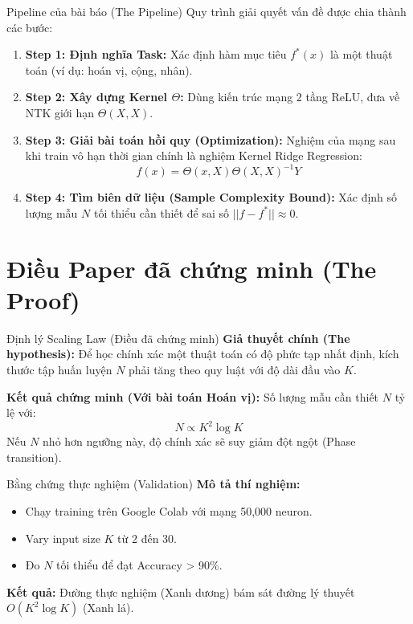 \documentclass[12pt]{beamer}
\begin{document}
\begin{frame}{Pipeline của bài báo (The Pipeline)}
  Quy trình giải quyết vấn đề được chia thành các bước:
  \begin{enumerate}
    \item \textbf{Step 1: Định nghĩa Task:}
          Xác định hàm mục tiêu $f^*(x)$ là một thuật toán (ví dụ: hoán vị, cộng, nhân).
    \item \textbf{Step 2: Xây dựng Kernel $\Theta$:}
          Dùng kiến trúc mạng 2 tầng ReLU, đưa về NTK giới hạn $\Theta(X,X)$.
    \item \textbf{Step 3: Giải bài toán hồi quy (Optimization):}
          Nghiệm của mạng sau khi train vô hạn thời gian chính là nghiệm Kernel Ridge Regression:
          \[ f(x) = \Theta(x, X) \Theta(X, X)^{-1} Y \]
    \item \textbf{Step 4: Tìm biên dữ liệu (Sample Complexity Bound):}
          Xác định số lượng mẫu $N$ tối thiểu cần thiết để sai số $||f - f^*|| \approx 0$.
  \end{enumerate}
\end{frame}

\section{Điều Paper đã chứng minh (The Proof)}

\begin{frame}{Định lý Scaling Law (Điều đã chứng minh)}
  \textbf{Giả thuyết chính (The hypothesis):}
  Để học chính xác một thuật toán có độ phức tạp nhất định, kích thước tập huấn luyện $N$ phải tăng theo quy luật với độ dài đầu vào $K$.

  \vspace{0.3cm}
  \textbf{Kết quả chứng minh (Với bài toán Hoán vị):}
  Số lượng mẫu cần thiết $N$ tỷ lệ với:
  \[
    \boxed{ N \propto K^2 \log K }
  \]
  Nếu $N$ nhỏ hơn ngưỡng này, độ chính xác sẽ suy giảm đột ngột (Phase transition).
\end{frame}

\begin{frame}{Bằng chứng thực nghiệm (Validation)}
  \textbf{Mô tả thí nghiệm:}
  \begin{itemize}
    \item Chạy training trên Google Colab với mạng 50,000 neuron.
    \item Vary input size $K$ từ 2 đến 30.
    \item Đo $N$ tối thiểu để đạt Accuracy > 90\%.
  \end{itemize}

  \vspace{0.2cm}
  \textbf{Kết quả:} Đường thực nghiệm (Xanh dương) bám sát đường lý thuyết $O(K^2 \log K)$ (Xanh lá).
\end{frame}
\end{document}
